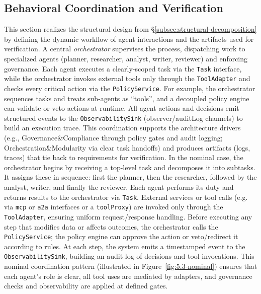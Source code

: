 \subsection{Behavioral Coordination and Verification}\label{subsec:behav}
This section realizes the structural design from §\ref{subsec:structural-decomposition} by defining the dynamic workflow of agent interactions and the artifacts used for verification. A central \emph{orchestrator} supervises the process, dispatching work to specialized agents (planner, researcher, analyst, writer, reviewer) and enforcing governance. Each agent executes a clearly-scoped task via the \texttt{Task} interface, while the orchestrator invokes external tools only through the \texttt{ToolAdapter} and checks every critical action via the \texttt{PolicyService}. For example, the orchestrator sequences tasks and treats sub-agents as “tools”, and a decoupled policy engine can validate or veto actions at runtime. All agent actions and decisions emit structured events to the \texttt{ObservabilitySink} (observer/auditLog channels) to build an execution trace. This coordination supports the architecture drivers (e.g., Governance&Compliance through policy gates and audit logging; Orchestration&Modularity via clear task handoffs) and produces artifacts (logs, traces) that tie back to requirements for verification. In the nominal case, the orchestrator begins by receiving a top-level task and decomposes it into subtasks. It assigns these in sequence: first the planner, then the researcher, followed by the analyst, writer, and finally the reviewer. Each agent performs its duty and returns results to the orchestrator via \texttt{Task}. External services or tool calls (e.g. via \texttt{mcp} or \texttt{a2a} interfaces or a \texttt{toolProxy}) are invoked only through the \texttt{ToolAdapter}, ensuring uniform request/response handling. Before executing any step that modifies data or affects outcomes, the orchestrator calls the \texttt{PolicyService}; the policy engine can approve the action or veto/redirect it according to rules. At each step, the system emits a timestamped event to the \texttt{ObservabilitySink}, building an audit log of decisions and tool invocations. This nominal coordination pattern (illustrated in Figure~\ref{fig:5.3-nominal}) ensures that each agent’s role is clear, all tool uses are mediated by adapters, and governance checks and observability are applied at defined gates.

